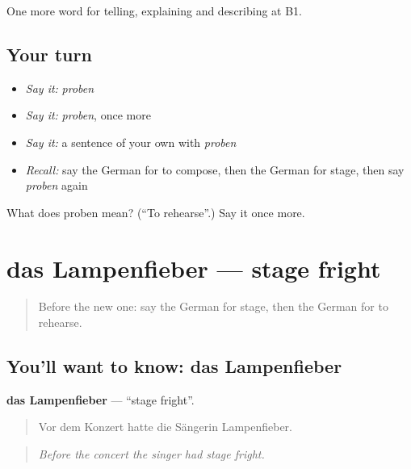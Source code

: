 \begin{grammarlens}[title={What you've built}]
One more word for telling, explaining and describing at B1.
\end{grammarlens}

\subsection*{Your turn}
\begin{itemize}
\raggedright
  \item \emph{Say it:} \emph{proben}
  \item \emph{Say it:} \emph{proben}, once more
  \item \emph{Say it:} a sentence of your own with \emph{proben}
  \item \emph{Recall:} say the German for to compose, then the German for stage, then say \emph{proben} again
\end{itemize}

\begin{tcolorbox}[breakable,colback=teal!4,colframe=teal!35!black,title={Before you move on}]
What does proben mean? (\textquotedblleft{}To rehearse\textquotedblright{}.) Say it once more.
\end{tcolorbox}
\section[das Lampenfieber]{das Lampenfieber — stage fright}

\label{lesson:GE-C516-lampenfieber}



\begin{quote}
Before the new one: say the German for stage, then the German for to rehearse.
\end{quote}

\subsection*{You'll want to know: das Lampenfieber}
\textbf{das Lampenfieber} — \textquotedblleft{}stage fright\textquotedblright{}.

\begin{quote}
Vor dem Konzert hatte die Sängerin Lampenfieber.
\end{quote}

\begin{quote}
\emph{Before the concert the singer had stage fright.}
\end{quote}

